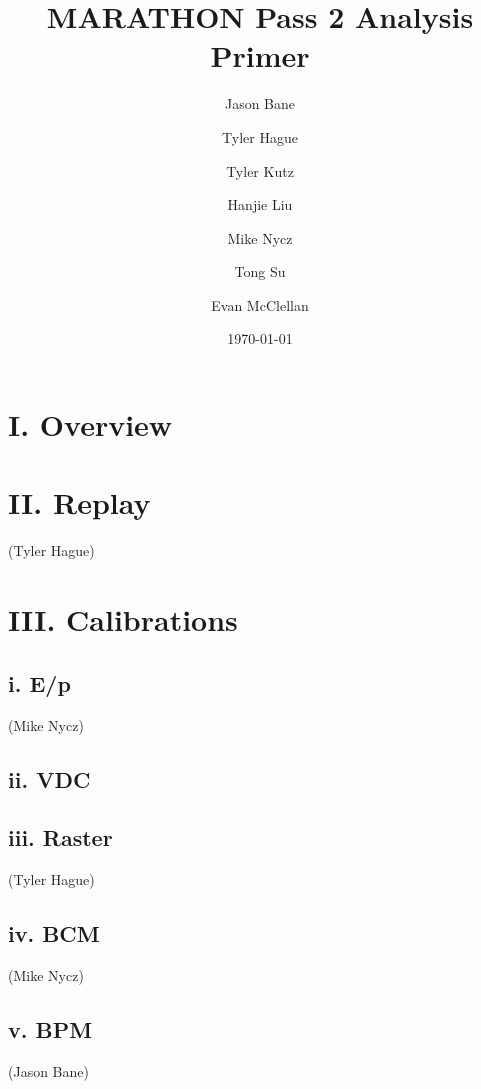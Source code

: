 \documentclass[letterpaper,aps,prl,superscriptaddress,floatfix,twocolumn]{revtex4}
\begin{document}
\title{MARATHON Pass 2 Analysis Primer}

\author{Jason Bane}
\author{Tyler Hague}
\author{Tyler Kutz}
\author{Hanjie Liu}
\author{Mike Nycz}
\author{Tong Su}

\author{Evan McClellan}


\date{\today}

\begin{abstract}
\end{abstract}

\maketitle

\section{I. Overview}

\section{II. Replay}
 (Tyler Hague)

\section{III. Calibrations}

 \subsection{i. E/p}
 (Mike Nycz)

 \subsection{ii. VDC}

 \subsection{iii. Raster}
 (Tyler Hague)

 \subsection{iv. BCM}
 (Mike Nycz)

 \subsection{v. BPM}
 (Jason Bane)
\end{document}
